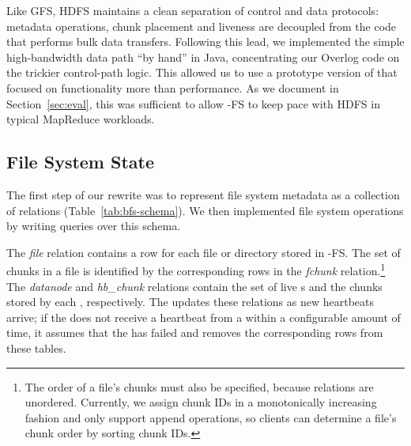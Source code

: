 
Like GFS, HDFS maintains a clean separation of control and data protocols:
metadata operations, chunk placement and {\DN} liveness are decoupled from the
code that performs bulk data transfers. Following this lead, we implemented the
simple high-bandwidth data path ``by hand'' in Java, concentrating our Overlog
code on the trickier control-path logic. This allowed us to use a prototype
version of \JOL that focused on functionality more than performance. As we
document in Section~\ref{sec:eval}, this was sufficient to allow \BOOM-FS to
keep pace with HDFS in typical MapReduce workloads.


\subsection{File System State}
The first step of our rewrite was to represent file system metadata as
a collection of relations (Table~\ref{tab:bfs-schema}). We then
implemented file system operations by writing queries over this
schema.

The \emph{file} relation contains a row for each file or directory stored in
\BOOM-FS\@. The set of chunks in a file is identified by the corresponding rows
in the \emph{fchunk} relation.\footnote{The order of a file's chunks must also
  be specified, because relations are unordered. Currently, we assign chunk IDs
  in a monotonically increasing fashion and only support append operations, so
  clients can determine a file's chunk order by sorting chunk IDs.} The
\emph{datanode} and \emph{hb\_chunk} relations contain the set of live {\DN}s
and the chunks stored by each {\DN}, respectively. The {\NN} updates these
relations as new heartbeats arrive; if the {\NN} does not receive a heartbeat
from a {\DN} within a configurable amount of time, it assumes that the {\DN} has
failed and removes the corresponding rows from these tables.

